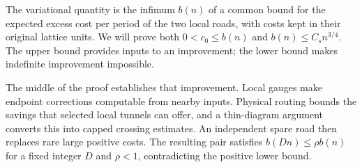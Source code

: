 The variational quantity is the infimum $b(n)$ of a common bound for
the expected excess cost per period of the two local roads, with costs
kept in their original lattice units. We will prove both
$0<c_0\le b(n)$ and $b(n)\le C_s n^{3/4}$. The upper bound provides
inputs to an improvement; the lower bound makes indefinite improvement
impossible.

The middle of the proof establishes that improvement. Local gauges
make endpoint corrections computable from nearby inputs. Physical
routing bounds the savings that selected local tunnels can offer, and
a thin-diagram argument converts this into capped crossing estimates.
An independent spare road then replaces rare large positive costs.
The resulting pair satisfies $b(Dn)\le\rho b(n)$ for a fixed integer
$D$ and $\rho<1$, contradicting the positive lower bound.
